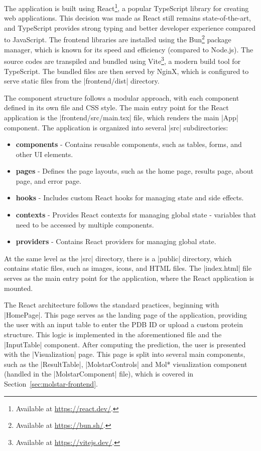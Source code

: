 The application is built using React\footnote{Available at \url{https://react.dev/}.}, a popular TypeScript library for creating web applications. This decision was made as React still remains state-of-the-art, and TypeScript provides strong typing and better developer experience compared to JavaScript. The frontend libraries are installed using the Bun\footnote{Available at \url{https://bun.sh/}.} package manager, which is known for its speed and efficiency (compared to Node.js). The source codes are transpiled and bundled using Vite\footnote{Available at \url{https://vitejs.dev/}.}, a modern build tool for TypeScript. The bundled files are then served by NginX, which is configured to serve static files from the \inline|frontend/dist| directory.

The component structure follows a modular approach, with each component defined in its own file and CSS style. The main entry point for the React application is the \inline|frontend/src/main.tsx| file, which renders the main \inline|App| component. The application is organized into several \inline|src| subdirectories:

\begin{itemize}
    \item \textbf{components} - Contains reusable components, such as tables, forms, and other UI elements.
    \item \textbf{pages} - Defines the page layouts, such as the home page, results page, about page, and error page.
    \item \textbf{hooks} - Includes custom React hooks for managing state and side effects.
    \item \textbf{contexts} - Provides React contexts for managing global state - variables that need to be accessed by multiple components.
    \item \textbf{providers} - Contains React providers for managing global state.
\end{itemize}

At the same level as the \inline|src| directory, there is a \inline|public| directory, which contains static files, such as images, icons, and HTML files. The \inline|index.html| file serves as the main entry point for the application, where the React application is mounted.

The React architecture follows the standard practices, beginning with \inline|HomePage|. This page serves as the landing page of the application, providing the user with an input table to enter the PDB ID or upload a custom protein structure. This logic is implemented in the aforementioned file and the \inline|InputTable| component. After computing the prediction, the user is presented with the \inline|Visualization| page. This page is split into several main components, such as the \inline|ResultTable|, \inline|MolstarControls| and Mol* visualization component (handled in the \inline|MolstarComponent| file), which is covered in Section~\ref{sec:molstar-frontend}.

